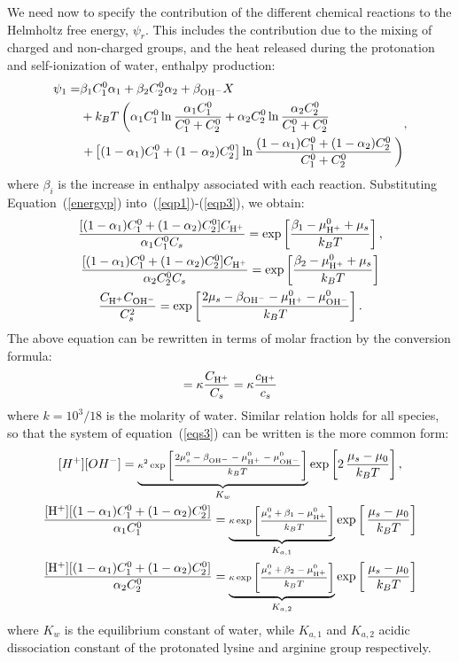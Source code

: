 \documentclass[12pt]{extarticle}
\begin{document}
We need now to specify the contribution of the different chemical reactions to the Helmholtz free energy, $\psi_r$. This includes the contribution due to the mixing of charged and non-charged groups, and the heat released during the protonation and self-ionization of water, enthalpy production:
\begin{equation}
\begin{aligned}
\psi_1 = &\beta_1 C^0_1\alpha_1 + \beta_2 C^0_2 \alpha_2 + \beta_{\ce{OH-}} X\\& + k_B T \left(\alpha_1 C^0_1 \ln\frac{ \alpha_1 C^0_1}{C^0_1 +C^0_2} + \alpha_2 C^0_2 \ln\frac{ \alpha_2 C^0_2}{C^0_1 +C^0_2}\right.\\
&
\left.+\left[(1-\alpha_1)C^0_1 +(1- \alpha_2) C^0_2\right] \ln \frac{(1-\alpha_1) C^0_1 +(1- \alpha_2 )C^0_2}{C^0_1 +C^0_2}\, \right) 
\end{aligned}\label{energyp}, 
\end{equation}
where $\beta_i$ is the increase in enthalpy associated with each reaction. Substituting Equation~(\ref{energyp}) into~(\ref{eqp1})-(\ref{eqp3}), we obtain:
\begin{gather}
\frac{[(1-\alpha_1)C^0_1+(1-\alpha_2)C^0_2] C_{\ce{H+}}}{\alpha_1 C^0_1 C_s}= \exp\left[\frac{\beta_1-\mu^0_{\ce{H+}}+\mu_s}{k_BT}\right], \label{eqs1}\\
\frac{[(1-\alpha_1)C^0_1+(1-\alpha_2)C^0_2] C_{\ce{H+}}}{\alpha_2 C^0_2 C_s}= \exp\left[\frac{\beta_2-\mu^0_{\ce{H+}}+\mu_s}{k_BT}\right]\\
\frac{C_{\ce{H+}}C_{\ce{OH-}}}{C^2_s} = \exp\left[\frac{2\mu_s-\beta_{\ce{OH-}}-\mu^0_{\ce{H+}}-\mu^0_{\ce{OH-}}}{k_BT}\right]\label{eqs3}.
\end{gather}
The above equation can be rewritten in terms of molar fraction by the conversion formula:
\begin{equation}
[\ce{H+}]= \kappa \frac{C_{\ce{H+}}}{C_s}= \kappa \frac{c_{\ce{H+}}}{c_s}
\end{equation}
where $k=10^3/18$ is the molarity of water. Similar relation holds for all species, so that the system of equation~(\ref{eqs3}) can be written is the more common form:
\begin{gather}
\scriptsize
[H^+][OH^-]= \underbrace{\kappa^2\exp\left[\frac{2\mu^0_s-\beta_{\ce{OH-}}-\mu^0_{\ce{H+}}-\mu^0_{\ce{OH-}}}{k_BT}\right]}_{K_w} \exp\left[2\,\frac{\mu_s-\mu_0}{k_B T}\right],\\
\scriptsize
\frac{[\ce{H+}][(1-\alpha_1)C^0_1+(1-\alpha_2)C^0_2]}{\alpha_1 C^0_1} = \underbrace{\kappa \exp\left[\frac{\mu^0_s+\beta_{1}-\mu^0_{\ce{H+}}}{k_BT}\right]}_{K_{a,1}} \exp \left[\,\frac{\mu_s-\mu_0}{k_B T}\right]\\
\scriptsize
\frac{[\ce{H+}][(1-\alpha_1)C^0_1+(1-\alpha_2)C^0_2]}{\alpha_2 C^0_2} = \underbrace{\kappa \exp\left[\frac{\mu^0_s+\beta_{2}-\mu^0_{\ce{H+}}}{k_BT}\right]}_{K_{a,2}} \exp \left[\,\frac{\mu_s-\mu_0}{k_B T}\right]
\end{gather}
where $K_w$ is the equilibrium constant of water, while $K_{a,1}$ and $K_{a,2}$ acidic dissociation constant of the protonated lysine and arginine group respectively. 
\end{document}
